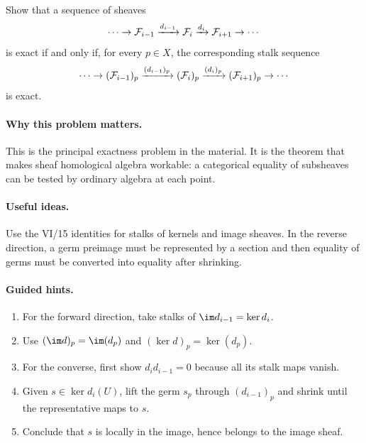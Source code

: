 \begin{problem}\label{prob:vi16-p01}
Show that a sequence of sheaves
\[
\cdots\to\mathcal F_{i-1}\xrightarrow{d_{i-1}}\mathcal F_i\xrightarrow{d_i}\mathcal F_{i+1}\to\cdots
\]
is exact if and only if, for every $p\in X$, the corresponding stalk sequence
\[
\cdots\to(\mathcal F_{i-1})_p\xrightarrow{(d_{i-1})_p}(\mathcal F_i)_p
\xrightarrow{(d_i)_p}(\mathcal F_{i+1})_p\to\cdots
\]
is exact.
\end{problem}

\ifdefined\FullProblemDossiers
\paragraph{Why this problem matters.}
This is the principal exactness problem in the material.  It is the theorem that makes sheaf homological algebra workable: a categorical equality of subsheaves can be tested by ordinary algebra at each point.

\paragraph{Useful ideas.}
Use the VI/15 identities for stalks of kernels and image sheaves.  In the reverse direction, a germ preimage must be represented by a section and then equality of germs must be converted into equality after shrinking.

\paragraph{Guided hints.}
\begin{enumerate}
\item For the forward direction, take stalks of $\im d_{i-1}=\ker d_i$.
\item Use $(\im d)_p=\im(d_p)$ and $(\ker d)_p=\ker(d_p)$.
\item For the converse, first show $d_i d_{i-1}=0$ because all its stalk maps vanish.
\item Given $s\in\ker d_i(U)$, lift the germ $s_p$ through $(d_{i-1})_p$ and shrink until the representative maps to $s$.
\item Conclude that $s$ is locally in the image, hence belongs to the image sheaf.
\end{enumerate}

